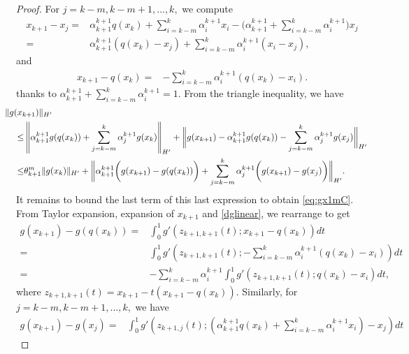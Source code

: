 \documentclass{article}
\numberwithin{equation}{section}
\begin{document}
\begin{proof}
For $j = k-m, k-m+1, \dots, k,$  we compute 
\begin{align*}
     x_{k+1} -x_j 
      = &  \alpha^{k+1}_{k+1} q(x_k) + \sum\limits_{i= k-m}^k \alpha_i^{k+1}x_i  -\bigg( \alpha_{k+1}^{k+1} +  \sum\limits_{i = k-m}^k \alpha_i^{k+1} \bigg) x_j\\
  = & \alpha_{k+1}^{k+1} (q(x_k) - x_j) + \sum\limits_{i=k-m}^k \alpha_i^{k+1} (x_i - x_j),
\end{align*}
and \begin{align*}
    x_{k+1} - q(x_k) = & 
   - \sum\limits_{i=k-m}^k \alpha_i^{k+1} (q(x_k) - x_i).
\end{align*}
thanks to $\alpha_{k+1}^{k+1}+ \sum\limits_{i=k-m}^k \alpha_i^{k+1} =1$.
From the triangle inequality, we have
   \begin{align}
     &   \hspace{-.3in} \| g(x_{k+1})\|_{H'} 
     \nonumber\\
    \le  &\left\| \alpha_{k+1}^{k+1} g( q(x_k)) + \sum\limits_{j=k-m}^k \alpha^{k+1}_j g(x_k) \right\|_{H'}  + 
    \bigg\| g(x_{k+1}) - \alpha^{k+1}_{k+1} g( q(x_k)) - \sum\limits_{j=k-m}^k \alpha^{k+1}_jg(x_j) \bigg\|_{H'} 
    \nonumber \\
    \le &  \theta_{k+1}^m \|g(x_{k} )\|_{H'} +   \bigg\| \alpha_{k+1}^{k+1} \bigg(g (x_{k+1}) - g(q(x_k)) \bigg)
    + \sum\limits_{j=k-m}^k \alpha_j^{k+1}\bigg( g(x_{k+1})  - g(x_j) \bigg) \bigg\|_{H'} .
    \label{eq:temp}
      \end{align}
      It remains to bound the last term of this last expression to obtain \eqref{eq:gx1mC}. From Taylor expansion, expansion of $x_{k+1}$ and \eqref{dglinear}, we rearrange to get
      \begin{align*}
     g (x_{k+1}) - g(q(x_k)) =  &  \int_0^1 g'\left(z_{k+1,k+1}(t); x_{k+1}-q(x_k) \right) dt
      \\
    = &  \int_0^1 g'\left(z_{k+1,k+1}(t); -\sum\limits_{i=k-m}^k \alpha_i^{k+1} (q(x_k) - x_i)\right) dt 
      \\
      = & -\sum\limits_{i=k-m}^k \alpha_i^{k+1}  \int_0^1 g'(z_{k+1,k+1}(t); q(x_k)-x_i) dt ,
      \end{align*}   
      where $ z_{k+1,k+1}(t) =  x_{k+1} -t (x_{k+1}-q(x_k)).$ 
 Similarly, for $j = k-m, k-m+1, \dots, k,$ we have
      \begin{align*}
      g(x_{k+1})  - g(x_j)  = &  \int_0^1 g'\left(z_{k+1,j}(t); \left(  \alpha_{k+1}^{k+1} q(x_k) + \sum\limits_{i=k-m}^k \alpha^{k+1}_i x_i \right) - x_j\right) dt

\end{align*}
\end{proof}
\end{document}
